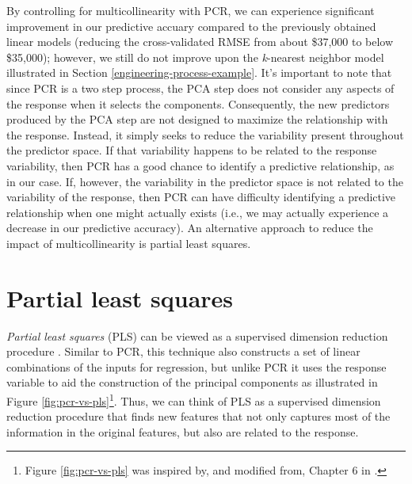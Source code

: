 \documentclass[]{krantz}
\begin{document}
By controlling for multicollinearity with PCR, we can experience significant improvement in our predictive accuary compared to the previously obtained linear models (reducing the cross-validated RMSE from about \$37,000 to below \$35,000); however, we still do not improve upon the \emph{k}-nearest neighbor model illustrated in Section \ref{engineering-process-example}. It's important to note that since PCR is a two step process, the PCA step does not consider any aspects of the response when it selects the components. Consequently, the new predictors produced by the PCA step are not designed to maximize the relationship with the response. Instead, it simply seeks to reduce the variability present throughout the predictor space. If that variability happens to be related to the response variability, then PCR has a good chance to identify a predictive relationship, as in our case. If, however, the variability in the predictor space is not related to the variability of the response, then PCR can have difficulty identifying a predictive relationship when one might actually exists (i.e., we may actually experience a decrease in our predictive accuracy). An alternative approach to reduce the impact of multicollinearity is partial least squares.

\hypertarget{partial-least-squares}{%
\section{Partial least squares}\label{partial-least-squares}}

\emph{Partial least squares} (PLS) can be viewed as a supervised dimension reduction procedure \citep{apm}. Similar to PCR, this technique also constructs a set of linear combinations of the inputs for regression, but unlike PCR it uses the response variable to aid the construction of the principal components as illustrated in Figure \ref{fig:pcr-vs-pls}\footnote{Figure \ref{fig:pcr-vs-pls} was inspired by, and modified from, Chapter 6 in \citet{apm}.}. Thus, we can think of PLS as a supervised dimension reduction procedure that finds new features that not only captures most of the information in the original features, but also are related to the response.
\end{document}
